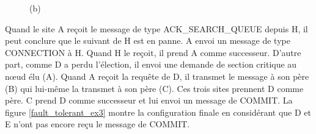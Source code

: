 \begin{figure}[H]
\centering
	\hspace{1cm}
	\caption{(b)\label{fault_tolerant_ex2}}
\end{figure}

Quand le site A reçoit le message de type ACK\_SEARCH\_QUEUE depuis H, il peut conclure que le suivant de H est en panne. A envoi un message de type CONNECTION à H. Quand H le reçoit, il prend A comme successeur. D'autre part, comme D a perdu l'élection, il envoi une demande de section critique au nœud élu (A). Quand A reçoit la requête de D, il transmet le message à son père (B) qui lui-même la transmet à son père (C). Ces trois sites prennent D comme père. C prend D comme successeur et lui envoi un message de COMMIT. La figure \ref{fault_tolerant_ex3} montre la configuration finale en considérant que D et E n'ont pas encore reçu le message de COMMIT.

